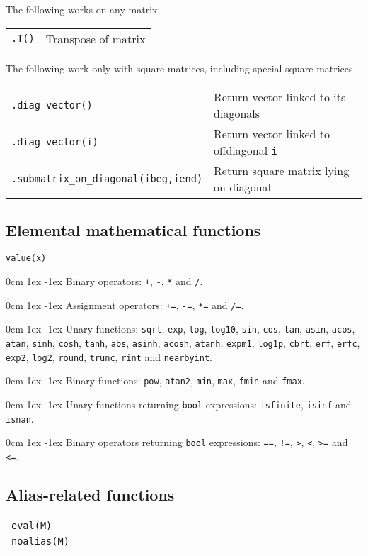 \documentclass[10pt,a4,landscape]{article}
\def\hangingpar{\parshape 2 0cm \linewidth 1ex \dimexpr\linewidth-1ex\relax}
\def\code#1{\texttt{#1}}
\begin{document}
The following works on any matrix:\\
\begin{tabular}{ll}
\code{.T()} & Transpose of matrix\\
\end{tabular}

The following work only with square matrices, including special square
matrices\\
\begin{tabular}{ll}
\code{.diag\_vector()} & Return vector linked to its diagonals\\
\code{.diag\_vector(i)} & Return vector linked to offdiagonal \code{i}\\
\code{.submatrix\_on\_diagonal(ibeg,iend)} & Return square matrix lying on diagonal\\
\end{tabular}
\subsection*{Elemental mathematical functions}
\code{value(x)}

\hangingpar
Binary operators: \code{+}, \code{-},
  \code{*} and \code{/}.

\hangingpar
Assignment operators:  \code{+=}, \code{-=}, \code{*=} and \code{/=}.

\hangingpar
Unary functions: \code{sqrt}, \code{exp},
  \code{log}, \code{log10}, \code{sin}, \code{cos}, \code{tan},
  \code{asin}, \code{acos}, \code{atan}, \code{sinh}, \code{cosh},
  \code{tanh}, \code{abs}, \code{asinh}, \code{acosh}, \code{atanh},
  \code{expm1}, \code{log1p}, \code{cbrt}, \code{erf}, \code{erfc},
  \code{exp2}, \code{log2}, \code{round}, \code{trunc}, \code{rint}
  and \code{nearbyint}.

\hangingpar
Binary functions: \code{pow}, \code{atan2}, \code{min},
  \code{max}, \code{fmin} and \code{fmax}.

\hangingpar
Unary functions returning \code{bool} expressions: \code{isfinite},
\code{isinf} and \code{isnan}.

\hangingpar
Binary operators returning \code{bool} expressions: \code{==},
\code{!=}, \code{>}, \code{<}, \code{>=} and \code{<=}.

\subsection*{Alias-related functions}
\begin{tabular}{ll}
\code{eval(M)} \\
\code{noalias(M)}\\
\end{tabular}
\end{document}

